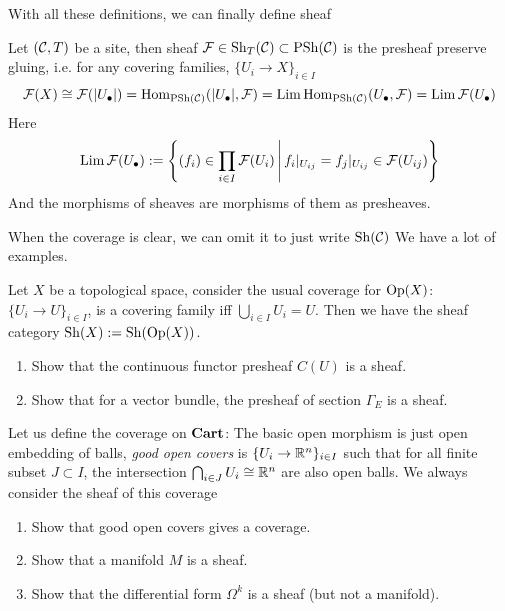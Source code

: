 With all these definitions, we can finally define sheaf
\begin{definition}[Sheaf]
 Let $(\mathcal{C},T)$ be a site, then sheaf $\mathcal{F}\in\mathrm{Sh}_T(\mathcal{C})\subset \mathrm{PSh}(\mathcal{C})$ is the presheaf preserve gluing, i.e. for any covering families, $\{ U_i \to X \}_{i \in I}$
   \[
     \mathcal{F}(X)\cong \mathcal{F}(|U_{\bullet}|) =\mathrm{Hom}_{\mathrm{PSh}(\mathcal{C})}(|U_{\bullet}|, \mathcal{F})= \operatorname*{\mathrm{Lim}} \mathrm{Hom}_{\mathrm{PSh}(\mathcal{C})}(U_{\bullet},\mathcal{F})=\operatorname*{\mathrm{Lim}} \mathcal{F}(U_{\bullet})
   \] 
  Here \[
    \operatorname*{\mathrm{Lim}} \mathcal{F}(U_{\bullet}) := \left\{ (f_i)\in \prod_{i\in I}\mathcal{F}(U_{i}) \,\middle\vert\, f_i|_{U_{ij}}=f_j|_{U_{ij}}\in \mathcal{F}(U_{ij})\right\}
  \] 
  And the morphisms of sheaves are morphisms of them as presheaves.
\end{definition}
When the coverage is clear, we can omit it to just write $ \mathrm{Sh}(\mathcal{C})$
We have a lot of examples.
\begin{example}
  Let $X$ be a topological space, consider the usual coverage for $\mathrm{Op}(X)$: $\{ U_i \to U \}_{i \in I}$, is a covering family iff $ \bigcup_{i\in I} U_i =U$. Then we have the sheaf category $\mathrm{Sh}(X):= \mathrm{Sh}(\mathrm{Op}(X))$.
  
  \begin{exercise}
   \begin{enumerate}
    \item Show that the continuous functor presheaf $C(U)$ is a sheaf.
    \item Show that for a vector bundle, the presheaf of section $\Gamma_E$ is a sheaf.
   \end{enumerate} 
  \end{exercise}
\end{example}

\begin{example}
  Let us define the coverage on $\mathbf{Cart}$: The basic open morphism is just open embedding of balls, \emph{good open covers} is $\{ U_i \to \mathbb{R}^n \}_{i \in I}$ such that for all finite subset $J\subset I $, the intersection $\bigcap_{i\in J}U_i \cong \mathbb{R}^n$ are also open balls. We always consider the sheaf of this coverage
  \begin{exercise}
   \begin{enumerate}
    \item Show that good open covers gives a coverage. 
    \item Show that a manifold $M$ is a sheaf.
    \item Show that the differential form $\Omega^k$ is a sheaf (but not a manifold).
   \end{enumerate} 
  \end{exercise}
\end{example}

